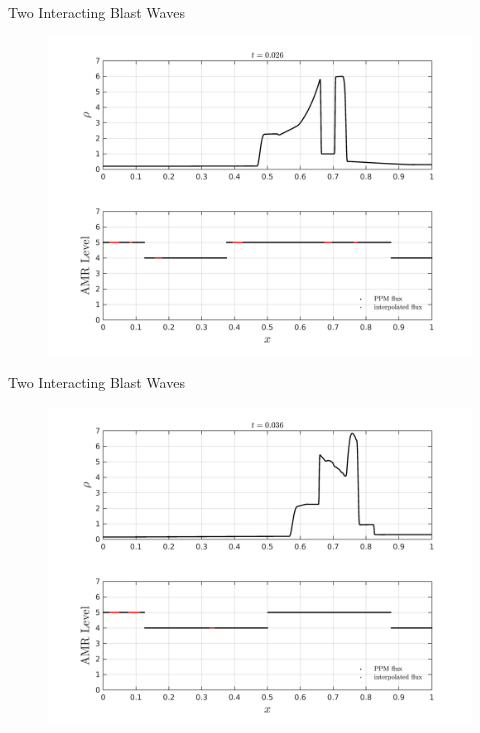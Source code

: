 \documentclass{beamer}
\begin{document}
\begin{frame}{Two Interacting Blast Waves}
  \begin{figure}
    \center
    \includegraphics[scale=0.4]{blast2_late.png}
  \end{figure}
\end{frame}

\begin{frame}{Two Interacting Blast Waves}
  \begin{figure}
    \center
    \includegraphics[scale=0.4]{blast2_vlate.png}
  \end{figure}
\end{frame}
\end{document}
